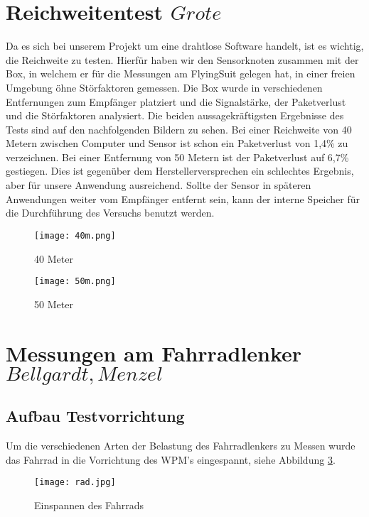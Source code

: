 \clearpage
\section{Reichweitentest \(Grote\)}

Da es sich bei unserem Projekt um eine drahtlose Software handelt, ist es wichtig, die Reichweite zu testen. Hierfür haben wir den Sensorknoten zusammen mit der Box, in welchem er für die Messungen am FlyingSuit gelegen hat, in einer freien Umgebung öhne Störfaktoren gemessen. Die Box wurde in verschiedenen Entfernungen zum Empfänger platziert und die Signalstärke, der Paketverlust und die Störfaktoren analysiert. Die beiden aussagekräftigsten Ergebnisse des Tests sind auf den nachfolgenden Bildern zu sehen.
Bei einer Reichweite von 40 Metern zwischen Computer und Sensor ist schon ein Paketverlust von 1,4\% zu verzeichnen. Bei einer Entfernung von 50 Metern ist der Paketverlust auf 6,7\% gestiegen. Dies ist gegenüber dem Herstellerversprechen ein schlechtes Ergebnis, aber für unsere Anwendung ausreichend. Sollte der Sensor in späteren Anwendungen weiter vom Empfänger entfernt sein, kann der interne Speicher für die Durchführung des Versuchs benutzt werden.

\begin{figure}[htbp]
    \begin{center}
        \texttt{[image: 40m.png]}
        \caption[Reichweitentest 40 Meter]{40 Meter
        }
        \label{fig:40m}
    \end{center}
\end{figure}

\begin{figure}[htbp]
    \begin{center}
        \texttt{[image: 50m.png]}
        \caption[Reichweitentest 50 Meter]{50 Meter
        }
        \label{fig:50m}
    \end{center}
\end{figure}

\clearpage
\section{Messungen am Fahrradlenker \(Bellgardt, Menzel\)}
\subsection{Aufbau Testvorrichtung}
Um die verschiedenen Arten der Belastung des Fahrradlenkers zu Messen wurde das Fahrrad in die Vorrichtung des WPM's eingespannt, siehe Abbildung \ref{fig:rad}.
\begin{figure}[htbp]
    \begin{center}
        \texttt{[image: rad.jpg]}
        \caption[Einspannen des Fahrrads (Abbildungsverzeichnis)]{Einspannen des Fahrrads}
        
        \label{fig:rad}
    \end{center}
\end{figure}

